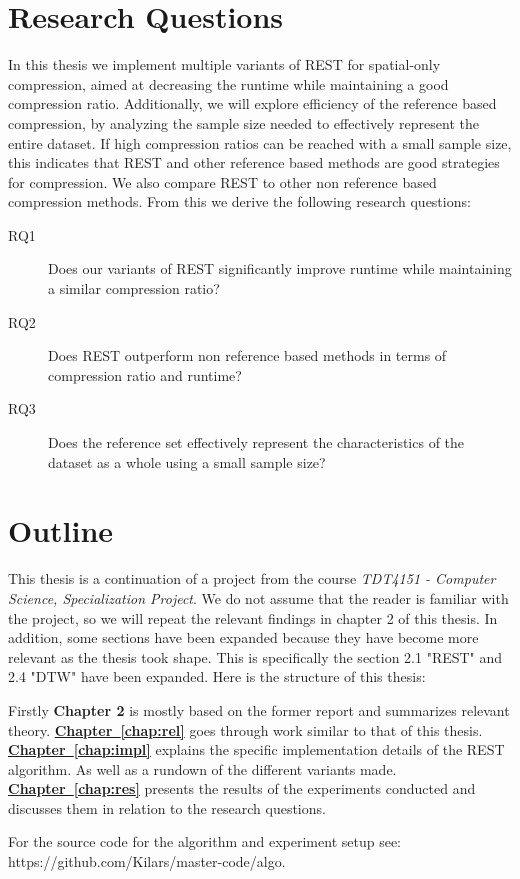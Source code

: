 \section{Research Questions}
\label{sec:questions}
In this thesis we implement multiple variants of REST for spatial-only compression, aimed at decreasing the runtime while maintaining a good compression ratio. Additionally, we will explore efficiency of the reference based compression, by analyzing the sample size needed to effectively represent the entire dataset. If high compression ratios can be reached with a small sample size, this indicates that REST and other reference based methods are good strategies for compression. We also compare REST to other non reference based compression methods. From this we derive the following research questions:

\begin{description}
    \item[RQ1] Does our variants of REST significantly improve runtime while maintaining a similar compression ratio?
    \item[RQ2] Does REST outperform non reference based methods in terms of compression ratio and runtime?
    \item[RQ3] Does the reference set effectively represent the characteristics of the dataset as a whole using a small sample size?
\end{description}

\section{Outline}
This thesis is a continuation of a project from the course \textit{TDT4151 - Computer Science, Specialization Project}. We do not assume that the reader is familiar with the project, so we will repeat the relevant findings in chapter 2 of this thesis. In addition, some sections have been expanded because they have become more relevant as the thesis took shape. This is specifically the section 2.1 "REST" and 2.4 "DTW" have been expanded. Here is the structure of this thesis:

Firstly \textbf{Chapter 2} is mostly based on the former report and summarizes relevant theory.
\newline
\textbf{\hyperref[chap:impl]{Chapter~\ref*{chap:rel}}} goes through work similar to that of this thesis.
\newline
\textbf{\hyperref[chap:methodology]{Chapter~\ref*{chap:impl}}} explains the specific implementation details of the REST algorithm. As well as a rundown of the different variants made.
\newline
\textbf{\hyperref[chap:impl]{Chapter~\ref*{chap:res}}} presents the results of the experiments conducted and discusses them in relation to the research questions.

For the source code for the algorithm and experiment setup see:\\ https://github.com/Kilars/master-code/algo.

